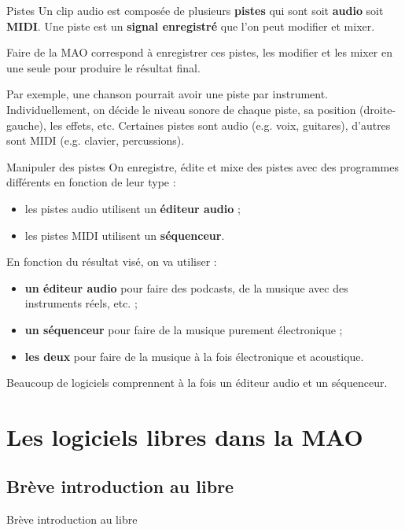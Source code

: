 \documentclass{beamer}
\begin{document}
\begin{frame}{Pistes}
  Un clip audio est composée de plusieurs \textbf{pistes} qui sont soit \textbf{audio} soit \textbf{MIDI}. Une piste est un \textbf{signal enregistré} que l'on peut modifier et mixer.
  \medskip
  
  Faire de la MAO correspond à enregistrer ces pistes, les modifier et les mixer en une seule pour produire le résultat final.
  \medskip
  
  Par exemple, une chanson pourrait avoir une piste par instrument. Individuellement, on décide le niveau sonore de chaque piste, sa position (droite-gauche), les effets, etc. Certaines pistes sont audio (e.g. voix, guitares), d'autres sont MIDI (e.g. clavier, percussions).
\end{frame}

\begin{frame}{Manipuler des pistes}
  On enregistre, édite et mixe des pistes avec des programmes différents en fonction de leur type :
  \begin{itemize}
  \item les pistes audio utilisent un \textbf{éditeur audio} ;
  \item les pistes MIDI utilisent un \textbf{séquenceur}.
  \end{itemize}
  
  En fonction du résultat visé, on va utiliser :
  \begin{itemize}
  \item \textbf{un éditeur audio} pour faire des podcasts, de la musique avec des instruments réels, etc. ;
  \item \textbf{un séquenceur} pour faire de la musique purement électronique ;
  \item \textbf{les deux} pour faire de la musique à la fois électronique et acoustique.
  \end{itemize}
  Beaucoup de logiciels comprennent à la fois un éditeur audio et un séquenceur.
\end{frame}




\section{Les logiciels libres dans la MAO}
\subsection{Brève introduction au libre}
\begin{frame}{Brève introduction au libre}
\end{frame}
\end{document}
